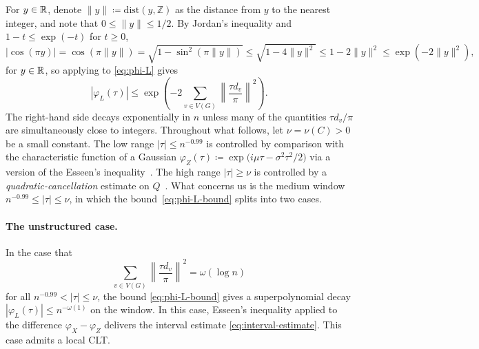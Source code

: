 For $y \in \mathbb{R}$, denote $\|y\| \coloneqq \mathrm{dist}(y, \mathbb{Z})$ as the distance from $y$ to the nearest integer, and note that $0 \leq \|y\| \leq 1/2$. By Jordan's inequality and $1 - t \leq \exp(-t)$ for $t \geq 0$, 
\[
  |\cos(\pi y)| = \cos(\pi \|y\|) = \sqrt{1 \!- \sin^2(\pi \|y\|)} \leq \sqrt{1 \!-\! 4\|y\|^2} \leq 1 - 2\|y\|^2 \leq \exp(-2\|y\|^2),
\]
for $y \in \mathbb{R}$, so applying to \eqref{eq:phi-L} gives
\begin{equation}
\label{eq:phi-L-bound}
|\varphi_L(\tau)| \leq \exp\left(-2\sum_{v \in V(G)} \left\|\frac{\tau d_v}{\pi}\right\|^2\right).
\end{equation}
The right-hand side decays exponentially in $n$ unless many of the quantities $\tau d_v/\pi$ are simultaneously close to integers. Throughout what follows, let $\nu = \nu(C) > 0$ be a small constant. The low range $|\tau| \leq n^{-0.99}$ is controlled by comparison with the characteristic function of a Gaussian $\varphi_Z(\tau) \coloneqq \exp\bigl(i \mu \tau - \sigma^2 \tau^2/2\bigr)$ via a version of the Esseen's inequality~\cite[Lemma 6.1]{Kwan_2023}. The high range $|\tau| \geq \nu$ is controlled by a \textit{quadratic-cancellation} estimate on $Q$~\cite[Section 8]{Kwan_2023}. What concerns us is the medium window $n^{-0.99} \leq |\tau| \leq \nu$, in which the bound~\eqref{eq:phi-L-bound} splits into two cases. 

\paragraph{The unstructured case.} In the case that
\[
  \sum_{v \in V(G)} \left\|\frac{\tau d_v}{\pi}\right\|^2 = \omega(\log n)
\]
for all $n^{-0.99} < |\tau| \leq \nu$, the bound \eqref{eq:phi-L-bound} gives a superpolynomial decay $|\varphi_L(\tau)| \leq n^{-\omega(1)}$ on the window. In this case, Esseen's inequality applied to the difference $\varphi_X - \varphi_Z$ delivers the interval estimate \eqref{eq:interval-estimate}. This case admits a local CLT.

